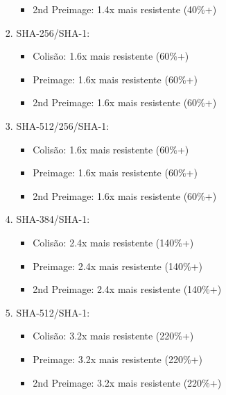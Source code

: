 \documentclass[12pt, a4paper]{article}
\begin{document}
\begin{enumerate}
\begin{enumerate}
\begin{enumerate}
\begin{itemize}
 \item 2nd Preimage: 1.4x mais resistente (40\%+)
 \end{itemize}
\item SHA-256/SHA-1:
 \begin{itemize}
 \item Colisão: 1.6x mais resistente (60\%+)

 \item Preimage: 1.6x mais resistente (60\%+)

 \item 2nd Preimage: 1.6x mais resistente (60\%+)
 \end{itemize}
\item SHA-512/256/SHA-1:
 \begin{itemize}
 \item Colisão: 1.6x mais resistente (60\%+)

 \item Preimage: 1.6x mais resistente (60\%+)

 \item 2nd Preimage: 1.6x mais resistente (60\%+)
 \end{itemize}
\item SHA-384/SHA-1:
 \begin{itemize}
 \item Colisão: 2.4x mais resistente (140\%+)

 \item Preimage: 2.4x mais resistente (140\%+)

 \item 2nd Preimage: 2.4x mais resistente (140\%+)
 \end{itemize}
\item SHA-512/SHA-1:
 \begin{itemize}
 \item Colisão: 3.2x mais resistente (220\%+)

 \item Preimage: 3.2x mais resistente (220\%+)

 \item 2nd Preimage: 3.2x mais resistente (220\%+) \\
 \end{itemize}
\end{enumerate}


\end{enumerate}
\end{enumerate}
\end{document}
